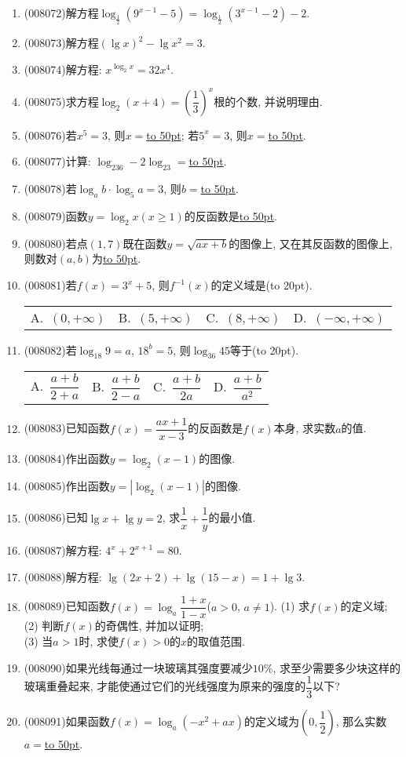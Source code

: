 \documentclass[10pt,a4paper]{article}
\newcommand{\blank}[1]{\underline{\hbox to #1pt{}}}
\newcommand{\bracket}[1]{(\hbox to #1pt{})}
\newcommand{\fourch}[4]{\par\begin{tabular}{p{.23\textwidth}p{.23\textwidth}p{.23\textwidth}p{.23\textwidth}}
A.~#1 &B.~#2& C.~#3& D.~#4
\end{tabular}}
\begin{document}
\begin{enumerate}[1.]
\item {\tiny (008072)}解方程$\log _{\frac 12}(9^{x-1}-5)=\log _{\frac 12}(3^{x-1}-2)-2$.
\item {\tiny (008073)}解方程$(\lg x)^2-\lg x^2=3$.
\item {\tiny (008074)}解方程: $x^{\log _2x}=32x^4$.
\item {\tiny (008075)}求方程$\log _2(x+4)=(\dfrac 13)^x$根的个数, 并说明理由.
\item {\tiny (008076)}若$x^5=3$, 则$x=$\blank{50}; 若$5^x=3$, 则$x=$\blank{50}.
\item {\tiny (008077)}计算: $\log _236-2\log _23=$\blank{50}.
\item {\tiny (008078)}若$\log _ab\cdot \log _5a=3$, 则$b=$\blank{50}.
\item {\tiny (008079)}函数$y=\log _2x(x\ge 1)$的反函数是\blank{50}.
\item {\tiny (008080)}若点$(1, 7)$既在函数$y=\sqrt {ax+b}$的图像上, 又在其反函数的图像上, 则数对$(a,b)$为\blank{50}.
\item {\tiny (008081)}若$f(x)=3^x+5$, 则$f^{-1}(x)$的定义域是\bracket{20}.
\fourch{$(0,+\infty)$}{$(5,+\infty)$}{$(8,+\infty)$}{$(-\infty ,+\infty)$}
\item {\tiny (008082)}若$\log _{18}9=a$, $18^b=5$, 则$\log _{36}45$等于\bracket{20}.
\fourch{$\dfrac{a+b}{2+a}$}{$\dfrac{a+b}{2-a}$}{$\dfrac{a+b}{2a}$}{$\dfrac{a+b}{a^2}$}
\item {\tiny (008083)}已知函数$f(x)=\dfrac{ax+1}{x-3}$的反函数是$f(x)$本身, 求实数$a$的值.
\item {\tiny (008084)}作出函数$y=\log _2(x-1)$的图像.
\item {\tiny (008085)}作出函数$y=|\log _2(x-1)|$的图像.
\item {\tiny (008086)}已知$\lg x+\lg y=2$, 求$\dfrac 1x+\dfrac 1y$的最小值.
\item {\tiny (008087)}解方程: $4^x+2^{x+1}=80$.
\item {\tiny (008088)}解方程: $\lg (2x+2)+\lg (15-x)=1+\lg 3$.
\item {\tiny (008089)}已知函数$f(x)=\log _a\dfrac{1+x}{1-x}$($a>0$, $a\ne 1$).
(1) 求$f(x)$的定义域;\\
(2) 判断$f(x)$的奇偶性, 并加以证明;\\
(3) 当$a>1$时, 求使$f(x)>0$的$x$的取值范围.
\item {\tiny (008090)}如果光线每通过一块玻璃其强度要减少$10\%$, 求至少需要多少块这样的玻璃重叠起来, 才能使通过它们的光线强度为原来的强度的$\dfrac 13$以下?
\item {\tiny (008091)}如果函数$f(x)=\log _a(-x^2+ax)$的定义域为$(0,\dfrac 12)$, 那么实数$a=$\blank{50}.

\end{enumerate}
\end{document}
